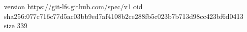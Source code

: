 version https://git-lfs.github.com/spec/v1
oid sha256:077c716c77d5ac03bb9ed7af4108b2ce288fb5c023b7b713d98cc423bf6d0413
size 339
